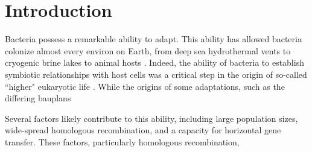 \chapter{Introduction}
\ifpdf
    \graphicspath{{Introduction/IntroductionFigs/PNG/}{Introduction/IntroductionFigs/PDF/}{Introduction/IntroductionFigs/}}
\else
    \graphicspath{{Introduction/IntroductionFigs/EPS/}{Introduction/IntroductionFigs/}}
\fi

Bacteria possess a remarkable ability to adapt. This ability has allowed bacteria colonize almost every environ on Earth, from deep sea hydrothermal vents \parencite{Jorgensen1992} to cryogenic brine lakes \parencite{Murray2012} to animal hosts \parencite{Finlay1997}. Indeed, the ability of bacteria to establish symbiotic relationships with host cells was a critical step in the origin of so-called ``higher" eukaryotic life \parencite{Sagan1967}. While the origins of some adaptations, such as the differing bauplans 

Several factors likely contribute to this ability, including large population sizes, wide-spread homologous recombination, and a capacity for horizontal gene transfer. These factors, particularly homologous recombination, 